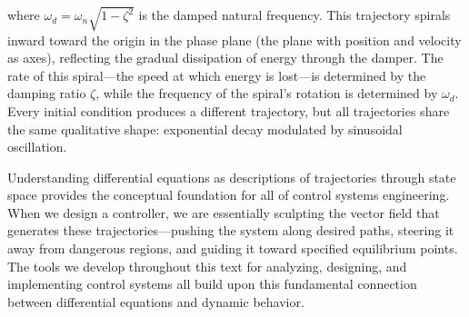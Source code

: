 where $\omega_d = \omega_n \sqrt{1-\zeta^2}$ is the damped natural frequency. This trajectory spirals inward toward the origin in the phase plane (the plane with position and velocity as axes), reflecting the gradual dissipation of energy through the damper. The rate of this spiral—the speed at which energy is lost—is determined by the damping ratio $\zeta$, while the frequency of the spiral's rotation is determined by $\omega_d$. Every initial condition produces a different trajectory, but all trajectories share the same qualitative shape: exponential decay modulated by sinusoidal oscillation.

Understanding differential equations as descriptions of trajectories through state space provides the conceptual foundation for all of control systems engineering. When we design a controller, we are essentially sculpting the vector field that generates these trajectories—pushing the system along desired paths, steering it away from dangerous regions, and guiding it toward specified equilibrium points. The tools we develop throughout this text for analyzing, designing, and implementing control systems all build upon this fundamental connection between differential equations and dynamic behavior.
